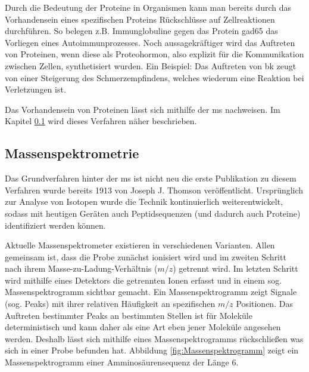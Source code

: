 \documentclass[11pt, a4paper, oneside]{article}
\begin{document}
Durch die Bedeutung der Proteine in Organismen kann man bereits durch das Vorhandensein eines spezifischen Proteins Rückschlüsse auf Zellreaktionen durchführen. So belegen z.B. Immunglobuline gegen das Protein \gls{gad65} das Vorliegen eines Autoimmunprozesses. Noch aussagekräftiger wird das Auftreten von Proteinen, wenn diese als Proteohormon, also explizit für die Kommunikation zwischen Zellen, synthetisiert wurden. Ein Beispiel: Das Auftreten von \gls{bk} zeugt von einer Steigerung des Schmerzempfindens, welches wiederum eine Reaktion bei Verletzungen ist.

Das Vorhandensein von Proteinen lässt sich mithilfe der \gls{ms} nachweisen. Im Kapitel \ref{ss:Massenspektrometrie} wird dieses Verfahren näher beschrieben.

\subsection{Massenspektrometrie}\label{ss:Massenspektrometrie}
Das Grundverfahren hinter der \gls{ms} ist nicht neu \dashAndSpace die erste Publikation zu diesem Verfahren wurde bereits 1913 von Joseph J. Thomson veröffentlicht. Ursprünglich zur Analyse von Isotopen wurde die Technik kontinuierlich weiterentwickelt, sodass mit heutigen Geräten auch Peptidsequenzen (und dadurch auch Proteine) identifiziert werden können.


Aktuelle Massenspektrometer existieren in verschiedenen Varianten. Allen gemeinsam ist, dass die Probe zunächst ionisiert wird und im zweiten Schritt nach ihrem Masse-zu-Ladung-Verhältnis ($m/z$) getrennt wird. Im letzten Schritt wird mithilfe eines Detektors die getrennten Ionen erfasst und in einem sog. Massenspektrogramm sichtbar gemacht. Ein Massenspektrogramm zeigt Signale (sog. Peaks) mit ihrer relativen Häufigkeit an spezifischen $m/z$ Positionen. Das Auftreten bestimmter Peaks an bestimmten Stellen ist für Moleküle deterministisch und kann daher als eine Art  eben jener Moleküle angesehen werden. Deshalb lässt sich mithilfe eines Massenspektrogramms rückschließen was sich in einer Probe befunden hat. Abbildung \ref{fig:Massenspektrogramm} zeigt ein Massenspektrogramm einer Amminosäurensequenz der Länge 6.
\end{document}

